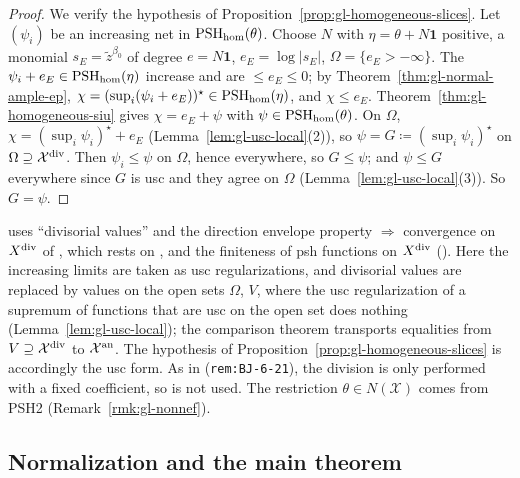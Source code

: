 \begin{proof}
We verify the hypothesis of Proposition~\ref{prop:gl-homogeneous-slices}. Let $(\psi_i)$ be an increasing net in $\operatorname{PSH}_{\mathrm{hom}}(\theta)$. Choose $N$ with
$\eta=\theta+N\mathbf1$ positive, a monomial $s_E=\tilde z^{\beta_0}$ of degree $e=N\mathbf 1$, $e_E=\log|s_E|$, $\Omega=\{e_E>-\infty\}$. The $\psi_i+e_E\in
\operatorname{PSH}_{\mathrm{hom}}(\eta)$ increase and are $\le e_E\le0$; by Theorem~\ref{thm:gl-normal-ample-ep}, $\chi=(\sup_i(\psi_i+e_E))^\star\in\operatorname{PSH}_{\mathrm{hom}}(\eta)$, and
$\chi\le e_E$. Theorem~\ref{thm:gl-homogeneous-siu} gives $\chi=e_E+\psi$ with $\psi\in\operatorname{PSH}_{\mathrm{hom}}(\theta)$. On $\Omega$, $\chi=(\sup_i\psi_i)^\star+e_E$
(Lemma~\ref{lem:gl-usc-local}(2)), so $\psi=G\coloneqq(\sup_i\psi_i)^\star$ on $\Omega\supseteq\mathcal X^{\mathrm{div}}$. Then $\psi_i\le\psi$ on $\Omega$, hence everywhere, so
$G\le\psi$; and $\psi\le G$ everywhere since $G$ is usc and they agree on $\Omega$ (Lemma~\ref{lem:gl-usc-local}(3)). So $G=\psi$.
\end{proof}

\begin{remark}[Deviations in \S7]\label{rmk:gl-siu-source}
\cite{FHX} uses ``divisorial values'' and the direction envelope property $\Rightarrow$ convergence on $X^{\mathrm{div}}$ of \cite[Proposition~2.4]{FHX}, which rests on
\cite[Theorem~5.6]{BJ22}, and the finiteness of psh functions on $X^{\mathrm{div}}$ (\cite[Corollary~4.17]{BJ22}). Here the increasing limits are taken as usc regularizations,
and divisorial values are replaced by values on the open sets $\Omega$, $V$, where the usc regularization of a supremum of functions that are usc on the open set
does nothing (Lemma~\ref{lem:gl-usc-local}); the comparison theorem transports equalities from $V\supseteq\mathcal X^{\mathrm{div}}$ to $\mathcal X^{\mathrm{an}}$. The hypothesis
of Proposition~\ref{prop:gl-homogeneous-slices} is accordingly the usc form. As in \cite[Remark~7.3]{FHX} (\texttt{rem:BJ-6-21}), the division is only performed with a
fixed coefficient, so \cite[Theorem~6.21]{BJ22} is not used. The restriction $\theta\in N(\mathcal X)$ comes from PSH2 (Remark~\ref{rmk:gl-nonnef}).
\end{remark}

\subsection{Normalization and the main theorem}\label{subsec:gl-main}

